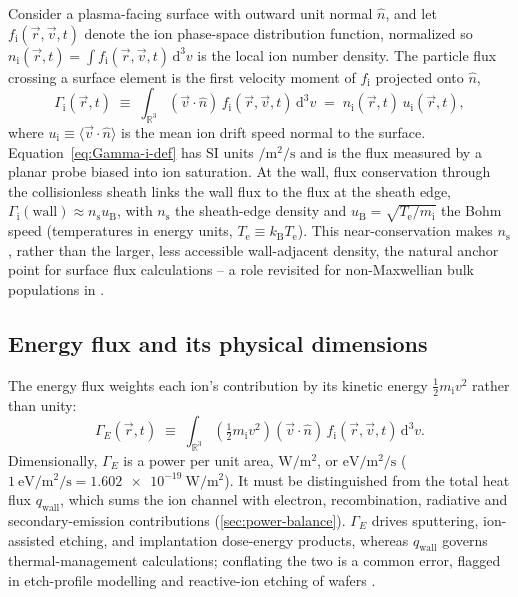 Consider a plasma-facing surface with outward unit normal $\hat{n}$, and let $f_{\mathrm{i}}(\vec r, \vec v, t)$ denote the ion phase-space distribution function, normalized so $n_{\mathrm{i}}(\vec r, t) = \int f_{\mathrm{i}}(\vec r, \vec v, t)\, \mathrm{d}^3 v$ is the local ion number density. The particle flux crossing a surface element is the first velocity moment of $f_{\mathrm{i}}$ projected onto $\hat n$,
\begin{equation}
\Gamma_{\mathrm{i}}(\vec r, t) \;\equiv\; \int_{\mathbb{R}^3} (\vec v \cdot \hat n)\, f_{\mathrm{i}}(\vec r, \vec v, t)\, \mathrm{d}^3 v \;=\; n_{\mathrm{i}}(\vec r,t)\, u_{\mathrm{i}}(\vec r,t),
\label{eq:Gamma-i-def}
\end{equation}
where $u_{\mathrm{i}} \equiv \langle \vec v \cdot \hat n \rangle$ is the mean ion drift speed normal to the surface. Equation~\eqref{eq:Gamma-i-def} has SI units $\si{\per\square\meter\per\second}$ and is the flux measured by a planar probe biased into ion saturation. At the wall, flux conservation through the collisionless sheath links the wall flux to the flux at the sheath edge, $\Gamma_{\mathrm{i}}(\text{wall}) \approx n_{\mathrm{s}} u_{\mathrm{B}}$, with $n_{\mathrm{s}}$ the sheath-edge density and $u_{\mathrm{B}} = \sqrt{T_{\mathrm{e}}/m_{\mathrm{i}}}$ the Bohm speed (temperatures in energy units, $T_{\mathrm{e}} \equiv k_{\mathrm B} T_{\mathrm{e}}$). This near-conservation makes $n_{\mathrm{s}}$, rather than the larger, less accessible wall-adjacent density, the natural anchor point for surface flux calculations -- a role revisited for non-Maxwellian bulk populations in \cite{ref0090}.

\subsection{Energy flux and its physical dimensions}

The energy flux weights each ion's contribution by its kinetic energy $\tfrac{1}{2} m_{\mathrm{i}} v^2$ rather than unity:
\begin{equation}
\Gamma_{E}(\vec r, t) \;\equiv\; \int_{\mathbb{R}^3} \left(\tfrac{1}{2} m_{\mathrm{i}} v^2\right) (\vec v \cdot \hat n)\, f_{\mathrm{i}}(\vec r, \vec v, t)\, \mathrm{d}^3 v.
\label{eq:GammaE-def}
\end{equation}
Dimensionally, $\Gamma_{E}$ is a power per unit area, $\si{\watt\per\square\meter}$, or $\si{\electronvolt\per\square\meter\per\second}$ ($\SI{1}{\electronvolt\per\square\meter\per\second} = \SI{1.602e-19}{\watt\per\square\meter}$). It must be distinguished from the total heat flux $q_{\mathrm{wall}}$, which sums the ion channel with electron, recombination, radiative and secondary-emission contributions (\cref{sec:power-balance}). $\Gamma_{E}$ drives sputtering, ion-assisted etching, and implantation dose-energy products, whereas $q_{\mathrm{wall}}$ governs thermal-management calculations; conflating the two is a common error, flagged in etch-profile modelling \cite{ref0074} and reactive-ion etching of wafers \cite{ref0080}.

